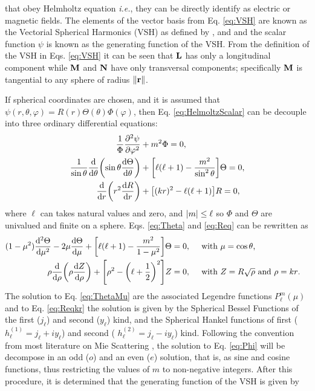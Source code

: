 that obey Helmholtz equation \textit{i.e.}, they can be directly identify as electric or magnetic fields. The elements of the vector basis from Eq. \eqref{eq:VSH}   are known as the Vectorial Spherical Harmonics (VSH) as defined by  \citeauthor{stratton_electromagnetic_2012} \cite{stratton_electromagnetic_2012}, and \citeauthor{bohren_absorption_1983} \cite{bohren_absorption_1983} and the scalar function $\psi$ is known as the generating function of the VSH. From the definition of the VSH in Eqs. \eqref{eq:VSH} it can be seen that $\vb{L}$ has only a longitudinal component while $\vb{M}$ and $\vb{N}$ have only transversal components; specifically $\vb{M}$ is tangential to any sphere of radius $\norm{\vb{r}}$.


If spherical coordinates are chosen, and it is assumed that $\psi(r,\theta,\varphi) = R(r)\Theta(\theta)\Phi(\varphi)$, then Eq. \eqref{eq:HelmoltzScalar} can be decouple into three ordinary differential equations:
%
 \begin{align}
	\frac{1}{\Phi}\pdv[2]{\psi}{\varphi} &+ m^2 \Phi =0,
 \label{eq:Phi}\\
	\frac{1}{\sin\theta}\dv{\theta}\qty(\sin\theta\dv{\Theta}{\theta}) &+ \qty[\ell(\ell+1)- \frac{m^2}{\sin^2\theta}]\Theta =0,
	\label{eq:Theta}\\
	\dv{r}\qty(r^2\dv{R}{r}) &+ \qty[ (k r)^2 - \ell (\ell +1)] R =0,
 \label{eq:Req}
\end{align}	
%
where $\ell$ can takes natural values and zero, and $\abs{m}\leq \ell$ so $\Phi$ and $\Theta$ are univalued and finite on a sphere. Eqs. \eqref{eq:Theta} and \eqref{eq:Req} can be rewritten as
%
 \begin{align}
(1-\mu^2)\dv[2]{\Theta}{\mu} - 2\mu\dv{\Theta}{\mu} + \qty[\ell(\ell+1)-\frac{m^2}{1-\mu^2}]\Theta &= 0, \qqtext{ with $\mu = \cos\theta$,}
	\label{eq:ThetaMu}\\
	\rho\dv{\rho}\qty(\rho\dv{Z}{\rho}) +  \qty[\rho^2 - \qty(\ell + \frac12)^2]Z  &= 0,  \qqtext{ with $Z = R\sqrt{\rho}$ and $\rho = kr$.}
\label{eq:Reqkr}
\end{align}	
%
The solution to Eq. \eqref{eq:ThetaMu} are the associated Legendre functions $ P_\ell^m(\mu)$ and to Eq. \eqref{eq:Reqkr} the solution is given by the Spherical Bessel Functions of the first ($j_\ell$)  and second ($y_\ell$) kind, and the Spherical Hankel functions of first ($h_\ell^{(1)} = j_\ell + iy_\ell$) and second ( $h_\ell^{(2)} = j_\ell - iy_\ell$)  kind. Following the convention from most literature on Mie Scattering \cite{zangwill_modern_2013}, the solution to Eq. \eqref{eq:Phi} will be decompose in an odd ($o$) and an even ($e$) solution, that is, as sine and cosine functions, thus restricting the values of $m$ to non-negative integers. After this procedure, it is determined that the generating function of the VSH is given by
